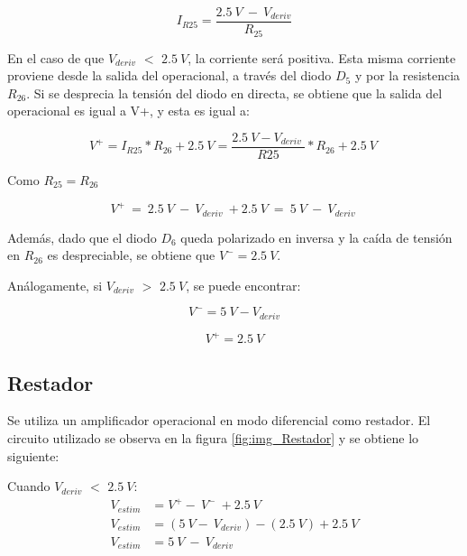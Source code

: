 \begin{equation} \label{eq_corriente_r25}
	I_{R25}=\frac{2.5\:V\ -\ V_{deriv}}{R_{25}}
\end{equation}

\noindent En el caso de que $V_{deriv}$ $\mathrm{<}$ $2.5\:V$, la corriente ser\'{a} positiva. Esta misma corriente proviene desde la salida del operacional, a trav\'{e}s del diodo $D_5$ y por la resistencia $R_{26}$. Si se desprecia la tensi\'{o}n del diodo en directa, se obtiene que la salida del operacional es igual a V+, y esta es igual a:

\begin{equation} \label{eq_V+}
	V^+=I_{R25}*R_{26}+2.5\:V=\frac{2.5\:V-V_{deriv}\ }{R25}*R_{26}+2.5\:V\ 
\end{equation} 

Como $R_{25}=R_{26}$

\begin{equation} \label{eq_V+_2}
	V^+\ =\ 2.5\:V\ -\ V_{deriv}\ +2.5\:V\ =\ 5\:V\ -\ V_{deriv}\ 
\end{equation}

Además, dado que el diodo $D_6$ queda polarizado en inversa y la caída de tensión en $R_{26}$ es despreciable, se obtiene que $V^- = 2.5\:V$.

An\'{a}logamente, si $V_{deriv}$ $\mathrm{>}$ $2.5\:V$, se puede encontrar:

\begin{equation} \label{eq_V+_3}
	V^- =5\:V-V_{deriv} 
\end{equation}

\begin{equation} 
	V^+ = 2.5\:V
\end{equation}


\subsection{Restador}

\noindent Se utiliza un amplificador operacional en modo diferencial como restador. El circuito utilizado se observa en la figura \ref{fig:img_Restador} y se obtiene lo siguiente:

\noindent Cuando $V_{deriv}$ $\mathrm{<}$ $2.5\:V$:
\begin{equation*} 
	\begin{aligned}
		V_{estim}&=V^+-\ V^-\ +2.5\:V\\ 
		V_{estim}&=(5\:V -\ V_{deriv})-(2.5\: V)+2.5\:V\\
		V_{estim}&=5\: V\ -\ V_{deriv}\\ 
	\end{aligned}
\end{equation*}


